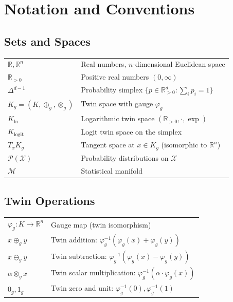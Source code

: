 \documentclass[11pt,twoside]{book}
\theoremstyle{plain}
\theoremstyle{definition}
\theoremstyle{remark}
\newcommand{\R}{\mathbb{R}}
\newcommand{\tplus}{\oplus_g}
\newcommand{\tminus}{\ominus_g}
\newcommand{\ttimes}{\otimes_g}
\newcommand{\Kg}{K_g}
\newcommand{\Kln}{K_{\ln}}
\newcommand{\Klogit}{K_{\mathrm{logit}}}
\newcommand{\simplex}{\Delta}
\newcommand{\Rpos}{\R_{>0}}
\begin{document}

\tableofcontents

\listoffigures
{}

\listoftables
{}


\chapter*{Notation and Conventions}

\section*{Sets and Spaces}

\begin{tabular}{ll}
    $\R, \R^n$ & Real numbers, $n$-dimensional Euclidean space \\
    $\Rpos$ & Positive real numbers $(0, \infty)$ \\
    $\simplex^{d-1}$ & Probability simplex $\{p \in \Rpos^d : \sum_i p_i = 1\}$ \\
    $\Kg = (K, \tplus, \ttimes)$ & Twin space with gauge $\varphi_g$ \\
    $\Kln$ & Logarithmic twin space $(\Rpos, \cdot, \exp)$ \\
    $\Klogit$ & Logit twin space on the simplex \\
    $T_x \Kg$ & Tangent space at $x \in \Kg$ (isomorphic to $\R^n$) \\
    $\mathcal{P}(\mathcal{X})$ & Probability distributions on $\mathcal{X}$ \\
    $\mathcal{M}$ & Statistical manifold \\
\end{tabular}

\section*{Twin Operations}

\begin{tabular}{ll}
    $\varphi_g : K \to \R^n$ & Gauge map (twin isomorphism) \\
    $x \tplus y$ & Twin addition: $\varphi_g^{-1}(\varphi_g(x) + \varphi_g(y))$ \\
    $x \tminus y$ & Twin subtraction: $\varphi_g^{-1}(\varphi_g(x) - \varphi_g(y))$ \\
    $\alpha \ttimes x$ & Twin scalar multiplication: $\varphi_g^{-1}(\alpha \cdot \varphi_g(x))$ \\
    $0_g, 1_g$ & Twin zero and unit: $\varphi_g^{-1}(0), \varphi_g^{-1}(1)$ \\
\end{tabular}
\end{document}
